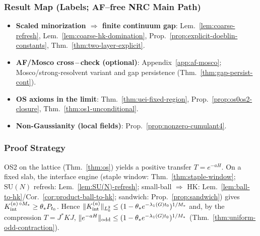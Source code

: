 \documentclass[11pt]{amsart}
\theoremstyle{plain}
\theoremstyle{definition}
\theoremstyle{remark}
\begin{document}
\begin{mdframed}[linewidth=0.5pt, linecolor=purple!40, backgroundcolor=purple!3, roundcorner=2pt, innertopmargin=8pt, innerbottommargin=8pt, skipabove=10pt, skipbelow=10pt]
\subsubsection*{Result Map (Labels; AF--free NRC Main Path)}
\begin{itemize}[leftmargin=2em, itemsep=4pt]
  \item \textbf{Scaled minorization $\Rightarrow$ finite continuum gap}: Lem.~\ref{lem:coarse-refresh}, Lem.~\ref{lem:coarse-hk-domination}, Prop.~\ref{prop:explicit-doeblin-constants}, Thm.~\ref{thm:two-layer-explicit}.
  \item \textbf{AF/Mosco cross\,–\,check (optional)}: Appendix~\ref{app:af-mosco}; Mosco/strong-resolvent variant and gap persistence (Thm.~\ref{thm:gap-persist-cont}).
  \item \textbf{OS axioms in the limit}: Thm.~\ref{thm:uei-fixed-region}, Prop.~\ref{prop:os0os2-closure}, Thm.~\ref{thm:os1-unconditional}.
  \item \textbf{Non-Gaussianity (local fields)}: Prop.~\ref{prop:nonzero-cumulant4}.
\end{itemize}
\end{mdframed}

\subsubsection*{Proof Strategy}
OS2 on the lattice (Thm.~\ref{thm:os}) yields a positive transfer $T=e^{-aH}$. On a fixed slab, the interface engine (staple window: Thm.~\ref{thm:staple-window}; $\mathrm{SU}(N)$ refresh: Lem.~\ref{lem:SU(N)-refresh}; small-ball $\Rightarrow$ HK: Lem.~\ref{lem:ball-to-hk}/Cor.~\ref{cor:product-ball-to-hk}; sandwich: Prop.~\ref{prop:sandwich}) gives $K_{\rm int}^{(a)\,\circ M_*}\ge \theta_* P_{t_0}$. Hence $\|K_{\rm int}^{(a)}\|_{L^2_0}\le (1-\theta_* e^{-\lambda_1(G) t_0})^{1/M_*}$ and, by the compression $T=J^* K J$, $\|e^{-aH}\|_{\rm odd}\le (1-\theta_* e^{-\lambda_1(G) t_0})^{1/M_*}$ (Thm.~\ref{thm:uniform-odd-contraction}).
\end{document}

